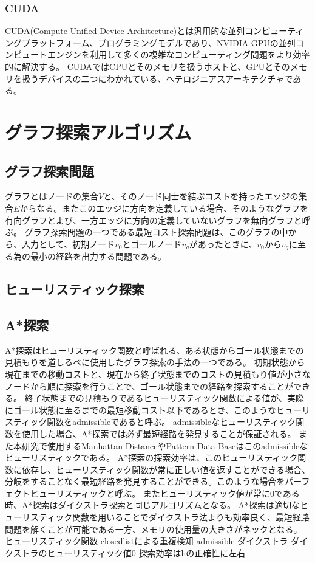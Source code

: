\documentclass[a4paper,11pt,oneside,openany]{jsbook}
\begin{document}
\subsection{CUDA}
CUDA(Compute Unified Device Architecture)とは汎用的な並列コンピューティングプラットフォーム、プログラミングモデルであり、NVIDIA GPUの並列コンピュートエンジンを利用して多くの複雑なコンピューティング問題をより効率的に解決する。
CUDAではCPUとそのメモリを扱うホストと、GPUとそのメモリを扱うデバイスの二つにわかれている、ヘテロジニアスアーキテクチャである。

\chapter{グラフ探索アルゴリズム}
\section{グラフ探索問題}
グラフとはノードの集合$V$と、そのノード同士を結ぶコストを持ったエッジの集合$E$からなる。またこのエッジに方向を定義している場合、そのようなグラフを有向グラフとよび、一方エッジに方向の定義していないグラフを無向グラフと呼ぶ。
グラフ探索問題の一つである最短コスト探索問題は、このグラフの中から、入力として、初期ノード$v_0$とゴールノード$v_g$があったときに、$v_0$から$v_g$に至る為の最小の経路を出力する問題である。

\section{ヒューリスティック探索}

\section{A*探索}
A*探索\cite{HNR68}はヒューリスティック関数と呼ばれる、ある状態からゴール状態までの見積もりを道しるべに使用したグラフ探索の手法の一つである。
初期状態から現在までの移動コストと、現在から終了状態までのコストの見積もり値が小さなノードから順に探索を行うことで、ゴール状態までの経路を探索することができる。
終了状態までの見積もりであるヒューリスティック関数による値が、実際にゴール状態に至るまでの最短移動コスト以下であるとき、このようなヒューリスティック関数をadmissibleであると呼ぶ。
admissibleなヒューリスティック関数を使用した場合、A*探索では必ず最短経路を発見することが保証される。
また本研究で使用するManhattan DistanceやPattern Data Baseはこのadmissibleなヒューリスティックである。
A*探索の探索効率は、このヒューリスティック関数に依存し、ヒューリスティック関数が常に正しい値を返すことができる場合、分岐をすることなく最短経路を発見することができる。このような場合をパーフェクトヒューリスティックと呼ぶ。
またヒューリスティック値が常に0である時、A*探索はダイクストラ探索と同じアルゴリズムとなる。
A*探索は適切なヒューリスティック関数を用いることでダイクストラ法よりも効率良く、最短経路問題を解くことが可能である一方、メモリの使用量の大きさがネックとなる。
ヒューリスティック関数
closedlistによる重複検知
admissible
ダイクストラ
ダイクストラのヒューリスティック値0
探索効率はhの正確性に左右
\end{document}
